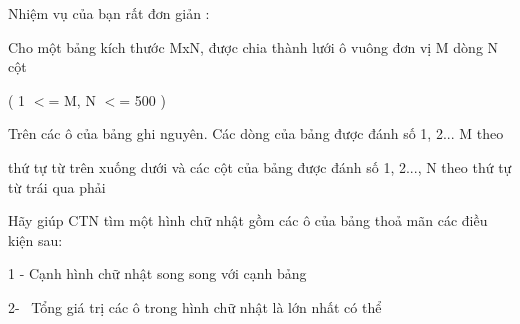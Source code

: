Nhiệm vụ của bạn rất đơn giản :

Cho một bảng kích thước MxN, được chia thành lưới ô vuông đơn vị M dòng N cột

( 1 $<$= M, N $<$= 500 )

Trên các ô của bảng ghi nguyên. Các dòng của bảng được đánh số 1, 2... M theo

thứ tự từ trên xuống dưới và các cột của bảng được đánh số 1, 2..., N theo thứ tự từ trái qua phải

Hãy giúp CTN tìm một hình chữ nhật gồm các ô của bảng thoả mãn các điều kiện sau:

1 - Cạnh hình chữ nhật song song với cạnh bảng

2-  Tổng giá trị các ô trong hình chữ nhật là lớn nhất có thể